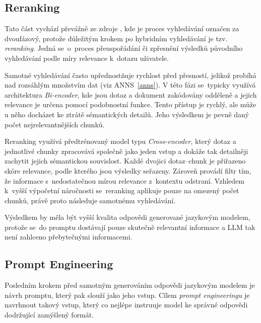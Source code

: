 \subsection{Reranking}
Tato část vychází převážně ze zdroje \cite{reranking}, kde je proces vyhledávání označen za dvoufázový, protože důležitým krokem po hybridním vyhledávání je tzv. \textit{reranking}. Jedná se~o~proces přeuspořádání či zpřesnění výsledků původního vyhledávání podle míry relevance k~dotazu uživatele.

Samotné vyhledávání často upřednostňuje rychlost před přesností, jelikož probíhá nad rozsáhlým množstvím dat (viz ANNS~\ref{anns}). V této fázi se~typicky využívá architektura \textit{Bi-encoder}, kde jsou dotaz a dokument zakódovány odděleně a jejich relevance je určena pomocí podobnostní funkce. Tento přístup je rychlý, ale může u něho docházet ke ztrátě sémantických detailů. Jeho výsledkem je pevně daný počet nejrelevantnějších chunků.

Reranking využívá předtrénovaný model typu \textit{Cross-encoder}, který dotaz a jednotlivé chunky zpracovává společně jako jeden vstup a dokáže tak detailněji zachytit jejich sémantickou souvislost. Každé dvojici dotaz–chunk je přiřazeno skóre relevance, podle kterého jsou výsledky seřazeny. Zároveň provádí filtr tím, že informace s~nedostatečnou mírou relevance z~kontextu odstraní. Vzhledem k~vyšší výpočetní náročnosti se~reranking aplikuje pouze na omezený počet chunků, právě proto následuje samotnému vyhledávání.

Výsledkem by měla být vyšší kvalita odpovědi generované jazykovým modelem, protože se~do promptu dostávají pouze skutečně relevantní informace a LLM tak není zahlceno přebytečnými informacemi.

\subsection{Prompt Engineering}
Posledním krokem před samotným generováním odpovědi jazykovým modelem je návrh promptu, který pak slouží jako jeho vstup. Cílem \textit{prompt engineeringu} je navrhnout takový vstup, který co nejlépe instruuje model ke správné odpovědi dodržující zamýšlený formát.

